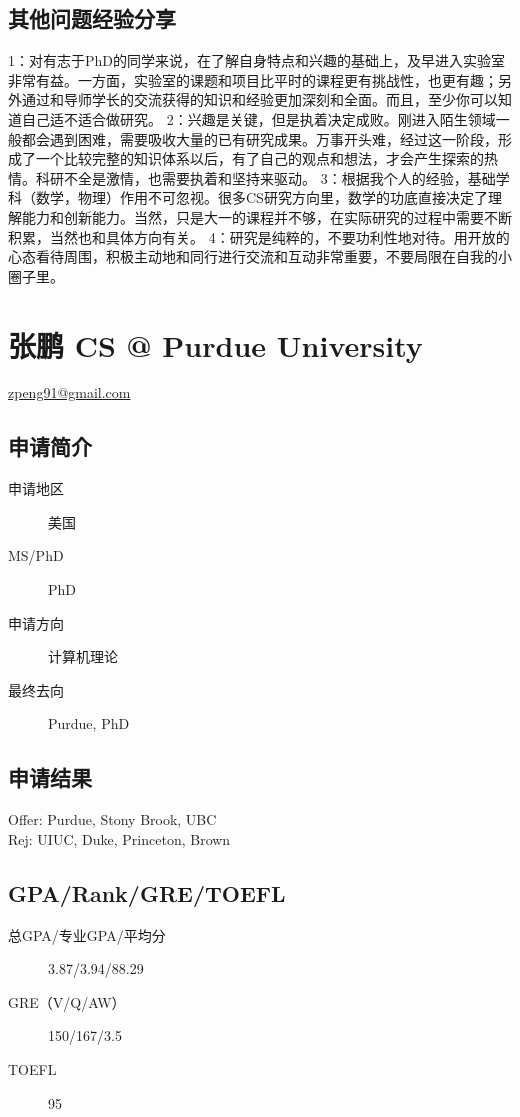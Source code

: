 \documentclass[11pt,fleqn,openany]{book} %
\begin{document}
\subsection*{其他问题经验分享}
1：对有志于PhD的同学来说，在了解自身特点和兴趣的基础上，及早进入实验室非常有益。一方面，实验室的课题和项目比平时的课程更有挑战性，也更有趣；另外通过和导师学长的交流获得的知识和经验更加深刻和全面。而且，至少你可以知道自己适不适合做研究。
2：兴趣是关键，但是执着决定成败。刚进入陌生领域一般都会遇到困难，需要吸收大量的已有研究成果。万事开头难，经过这一阶段，形成了一个比较完整的知识体系以后，有了自己的观点和想法，才会产生探索的热情。科研不全是激情，也需要执着和坚持来驱动。
3：根据我个人的经验，基础学科（数学，物理）作用不可忽视。很多CS研究方向里，数学的功底直接决定了理解能力和创新能力。当然，只是大一的课程并不够，在实际研究的过程中需要不断积累，当然也和具体方向有关。
4：研究是纯粹的，不要功利性地对待。用开放的心态看待周围，积极主动地和同行进行交流和互动非常重要，不要局限在自我的小圈子里。
\clearpage
\section{张鹏 CS @ Purdue University}
\hfill \href{mailto:zpeng91@gmail.com}{zpeng91@gmail.com}

\noindent\begin{minipage}[t]{0.45\textwidth}
\subsection*{申请简介}
\begin{description}
\item[申请地区] 美国
\item[MS/PhD] PhD
\item[申请方向] 计算机理论
\item[最终去向] Purdue, PhD
\end{description}
\end{minipage}
\hfill
\begin{minipage}[t]{0.45\textwidth}
\subsection*{申请结果}
\noindent Offer: Purdue, Stony Brook, UBC\\
Rej: UIUC, Duke, Princeton, Brown
\end{minipage}
\subsection*{GPA/Rank/GRE/TOEFL}
\begin{description}
\item[总GPA/专业GPA/平均分] 3.87/3.94/88.29
\item[GRE（V/Q/AW）] 150/167/3.5
\item[TOEFL] 95
\end{description}
\end{document}
